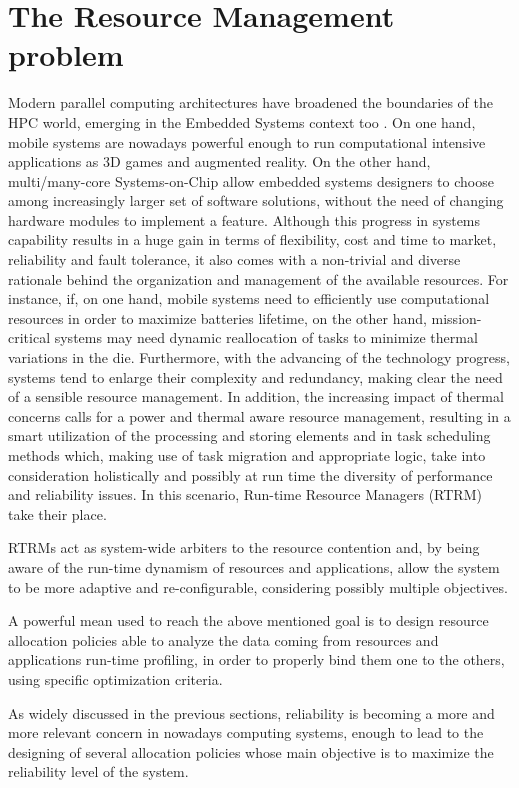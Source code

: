 \section{The Resource Management problem}
Modern parallel computing architectures have broadened the boundaries of the HPC world, emerging in the Embedded Systems context too \cite{6322885}. On one hand, mobile systems are nowadays powerful enough to run computational intensive applications as 3D games and augmented reality. On the other hand, multi/many-core Systems-on-Chip allow embedded systems designers to choose among increasingly larger set of software solutions, without the need of changing hardware modules to implement a feature. Although this progress in systems capability results in a huge gain in terms of flexibility, cost and time to market, reliability and fault tolerance, it also comes with a non-trivial and diverse rationale behind the organization and management of the available resources. For instance, if, on one hand, mobile systems need to efficiently use computational resources in order to maximize batteries lifetime, on the other hand, mission-critical systems may need dynamic reallocation of tasks to minimize  thermal variations in the die. Furthermore, with the advancing of the technology progress, systems tend to enlarge their complexity and redundancy, making clear the need of a sensible resource management. In addition, the increasing impact of thermal concerns calls for a power and thermal aware resource management, resulting in a smart utilization of the processing and storing elements and in task scheduling methods which, making use of task migration and appropriate logic, take into consideration holistically and possibly at run time the diversity of performance and reliability issues. In this scenario,  Run-time Resource Managers (RTRM) take their place.

RTRMs act as system-wide arbiters to the resource contention and, by being aware of the run-time dynamism of resources and applications, allow the system to be more adaptive and re-configurable, considering possibly multiple objectives.

A powerful mean used to reach the above mentioned goal is to design resource allocation policies able to analyze the data coming from resources and applications run-time profiling, in order to properly bind them one to the others, using specific optimization criteria.

As widely discussed in the previous sections, reliability is becoming a more and more relevant concern in nowadays computing systems, enough to lead to the designing of several allocation policies whose main objective is to maximize the reliability level of the system.

